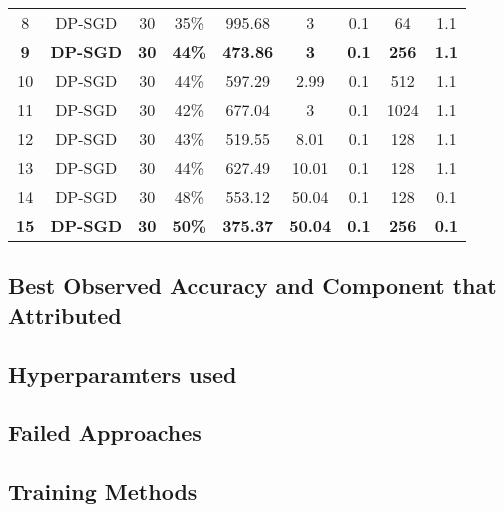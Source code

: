 \begin{table}[!ht]
{\begin{tabular}{|c|c|c|c|c|c|c|c|c|}
            8                      & DP-SGD             & 30              & 35\%              & 995.68                     & 3                     & 0.1                    & 64                  & 1.1                       \\
            \textbf{9}             & \textbf{DP-SGD}    & \textbf{30}     & \textbf{44\%}     & \textbf{473.86}            & \textbf{3}            & \textbf{0.1} & \textbf{256}  & \textbf{1.1} \\
            10                     & DP-SGD             & 30              & 44\%              & 597.29                     & 2.99                  & 0.1                    & 512                 & 1.1                       \\
            11                     & DP-SGD             & 30              & 42\%              & 677.04                     & 3                     & 0.1                    & 1024                & 1.1                       \\
            12                     & DP-SGD             & 30              & 43\%              & 519.55                     & 8.01                  & 0.1                    & 128                 & 1.1                       \\
            13                     & DP-SGD             & 30              & 44\%              & 627.49                     & 10.01                 & 0.1                    & 128                 & 1.1                       \\
            14                     & DP-SGD             & 30              & 48\%              & 553.12                     & 50.04                 & 0.1                    & 128                 & 0.1                       \\
            \textbf{15}            & \textbf{DP-SGD}    & \textbf{30}     & \textbf{50\%}     & \textbf{375.37}            & \textbf{50.04} & \textbf{0.1} & \textbf{256}  & \textbf{0.1} \\

            \hline
        \end{tabular}
    } %
    \label{tab:exp_results}  %
\end{table}

\subsection{Best Observed Accuracy and Component that Attributed}\label{subsec:best-accuracy}

\subsection{Hyperparamters used}\label{subsec:hyperparameters}

\subsection{Failed Approaches}\label{subsec:failed-approaches}

\subsection{Training Methods}\label{subsec:training-methods}